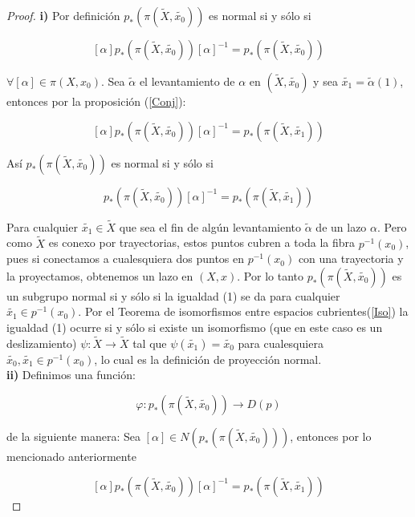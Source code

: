 \begin{proof}
\textbf{i)} Por definici\'on $p_*(\pi(\widetilde{X}, \widetilde{x_0}))$ es normal si y s\'olo si

$$[\alpha]p_*(\pi(\widetilde{X},\widetilde{x_0}))[\alpha]^{-1}= p_*(\pi(\widetilde{X},\widetilde{x_0}))$$

$\forall [\alpha]\in \pi(X,x_0)$. Sea $\widetilde{\alpha}$ el levantamiento de $\alpha$ en $(\widetilde{X},\widetilde{x_0})$ y sea $\widetilde{x_1} = \widetilde{\alpha}(1)$, entonces por la proposici\'on (\ref{Conj}):

$$[\alpha]p_*(\pi(\widetilde{X},\widetilde{x_0}))[\alpha]^{-1}=p_*(\pi(\widetilde{X},\widetilde{x_1}))$$

As\'i $p_*(\pi(\widetilde{X},\widetilde{x_0}))$ es normal si y s\'olo si

\begin{equation}
[\alpha]p_*(\pi(\widetilde{X},\widetilde{x_0}))[\alpha]^{-1}=p_*(\pi(\widetilde{X},\widetilde{x_1}))
\end{equation}

Para cualquier $\widetilde{x_1} \in \widetilde{X}$ que sea el fin de alg\'un levantamiento $\widetilde{\alpha}$ de un lazo $\alpha$. Pero como $\widetilde{X}$ es conexo por trayectorias, estos puntos cubren a toda la fibra $p^{-1}(x_0)$, pues si conectamos a cualesquiera dos puntos en $p^{-1}(x_0)$ con una trayectoria y la proyectamos, obtenemos un lazo en $(X,x)$. Por lo tanto $p_*(\pi(\widetilde{X},\widetilde{x_0}))$ es un subgrupo normal si y s\'olo si la igualdad (1) se da para cualquier $\widetilde{x_1} \in p^{-1}(x_0)$. Por el Teorema de isomorfismos entre espacios cubrientes(\ref{Iso}) la igualdad (1) ocurre si y s\'olo si existe un isomorfismo (que en este caso es un deslizamiento) $\psi: \widetilde{X} \rightarrow \widetilde{X}$ tal que $\psi(\widetilde{x_1})=\widetilde{x_0}$ para cualesquiera $\widetilde{x_0}, \widetilde{x_1} \in p^{-1}(x_0)$, lo cual es la definici\'on de proyecci\'on normal.\\

\textbf{ii)} Definimos una funci\'on:

$$ \varphi: p_*(\pi(\widetilde{X},\widetilde{x_0})) \rightarrow D(p) $$

de la siguiente manera: Sea $[\alpha]\in N(p_*(\pi(\widetilde{X},\widetilde{x_0})))$, entonces por lo mencionado anteriormente 

$$[\alpha]p_*(\pi(\widetilde{X},\widetilde{x_0}))[\alpha]^{-1}=p_*(\pi(\widetilde{X},\widetilde{x_1}))$$


\end{proof}

